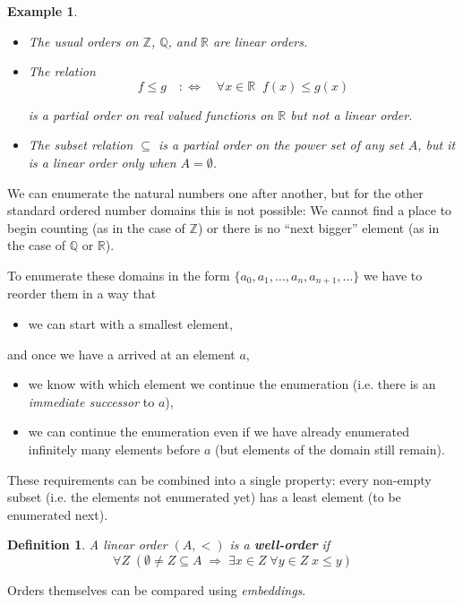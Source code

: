 \documentclass{article}
\newtheorem{definition}{Definition}[section]
\newtheorem{example}{Example}[section]
\begin{document}
\begin{example}\begin{itemize}
\item The usual orders on $\mathbb{Z}$, $\mathbb{Q}$, and $\mathbb{R}$ are linear orders.
\item The relation
\begin{equation}

f \leq g \quad : \iff \quad \forall x \in \mathbb{R} \;\; f(x) \leq g(x)
\end{equation}


is a partial order on real valued functions on $\mathbb{R}$ but not a linear order.
\item The subset relation $\subseteq$ is a partial order on the power set of any set $A$, but it is a linear order only when $A = \emptyset$.
\end{itemize}

\end{example}We can enumerate the natural numbers one after another, but for the other standard ordered number domains this is not possible: We cannot find a place to begin counting (as in the case of $\mathbb{Z}$) or there is no ``next bigger'' element (as in the case of $\mathbb{Q}$ or $\mathbb{R}$).

To enumerate these domains in the form $\{a_0, a_1,\ldots, a_n, a_{n+1}, \ldots \}$ we have to reorder them in a way that

\begin{itemize}
\item we can start with a smallest element,
\end{itemize}

and once we have a arrived at an element $a$,

\begin{itemize}
\item we know with which element we continue the enumeration (i.e. there is an \textit{immediate successor} to $a$),
\item we can continue the enumeration even if we have already enumerated infinitely many elements before $a$ (but elements of the domain still remain).
\end{itemize}

These requirements can be combined into a single property: every non-empty subset (i.e. the elements not enumerated yet) has a least element (to be enumerated next).

\begin{definition}A linear order $(A,<)$ is a \textbf{well-order} if
\begin{equation}

\forall Z \; (\emptyset \ne Z \subseteq A \; \Rightarrow \; \exists x \in Z \; \forall y \in Z \;  x \leq y)
\end{equation}

\end{definition}Orders themselves can be compared using \textit{embeddings}.
\end{document}
